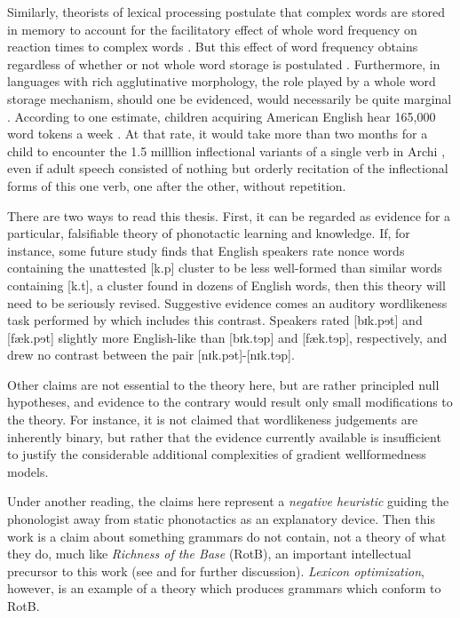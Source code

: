 Similarly, theorists of lexical processing postulate that complex words are stored in memory to account for the facilitatory effect of whole word frequency on reaction times to complex words \citep[e.g.,][]{Alegre1999,Baayen1997b,Sereno1997}. But this effect of word frequency obtains regardless of whether or not whole word storage is postulated \citep{Taft2004b,LignosInPress}. Furthermore, in languages with rich agglutinative morphology, the role played by a whole word storage mechanism, should one be evidenced, would necessarily be quite marginal \citep{Anderson1988a,Hankamer1992,Chan2008}. According to one estimate, children acquiring American English hear 165,000 word tokens a week \citep{Swingley2007}. At that rate, it would take more than two months for a child to encounter the 1.5 milllion inflectional variants of a single verb in Archi \citep[467]{Kibrik1998},
even if adult speech consisted of nothing but orderly recitation of the inflectional forms of this one verb, one after the other, without repetition.

There are two ways to read this thesis. First, it can be regarded as evidence for a particular, falsifiable theory of phonotactic learning and knowledge. If, for instance, some future study finds that English speakers rate nonce words containing the unattested [k.p] cluster to be less well-formed than similar words containing [k.t], a cluster found in dozens of English words, then this theory will need to be seriously revised. Suggestive evidence comes an auditory wordlikeness task performed by \citet[782]{Munson2001} which includes this contrast. Speakers rated [bɪk.pɘt] and [fæk.pɘt] slightly more English-like than [bɪk.tɘp] and [fæk.tɘp], respectively, and drew no contrast between the pair [nɪk.pɘt]-[nɪk.tɘp]. 

Other claims are not essential to the theory here, but are rather principled null hypotheses, and evidence to the contrary would result only small modifications to the theory. For instance, it is not claimed that wordlikeness judgements are inherently binary, but rather that the evidence currently available is insufficient to justify the considerable additional complexities of gradient wellformedness models.

Under another reading, the claims here represent a \emph{negative heuristic} guiding the phonologist away from static phonotactics as an explanatory device. Then this work is a claim about something grammars do not contain, not a theory of what they do, much like \emph{Richness of the Base} (RotB), an important intellectual precursor to this work (see \citealt[6]{Bye2001} and \citealt[73]{PE} for further discussion). \emph{Lexicon optimization}, however, is an example of a theory which produces grammars which conform to RotB. 

